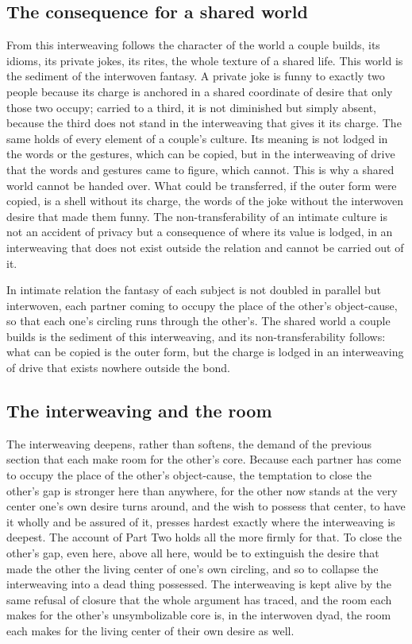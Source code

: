 \subsection*{The consequence for a shared world}

From this interweaving follows the character of the world a couple builds, its idioms, its private jokes, its rites, the whole texture of a shared life. This world is the sediment of the interwoven fantasy. A private joke is funny to exactly two people because its charge is anchored in a shared coordinate of desire that only those two occupy; carried to a third, it is not diminished but simply absent, because the third does not stand in the interweaving that gives it its charge. The same holds of every element of a couple's culture. Its meaning is not lodged in the words or the gestures, which can be copied, but in the interweaving of drive that the words and gestures came to figure, which cannot. This is why a shared world cannot be handed over. What could be transferred, if the outer form were copied, is a shell without its charge, the words of the joke without the interwoven desire that made them funny. The non-transferability of an intimate culture is not an accident of privacy but a consequence of where its value is lodged, in an interweaving that does not exist outside the relation and cannot be carried out of it.

\begin{claim}
In intimate relation the fantasy of each subject is not doubled in parallel but interwoven, each partner coming to occupy the place of the other's object-cause, so that each one's circling runs through the other's. The shared world a couple builds is the sediment of this interweaving, and its non-transferability follows: what can be copied is the outer form, but the charge is lodged in an interweaving of drive that exists nowhere outside the bond.
\end{claim}

\subsection*{The interweaving and the room}

The interweaving deepens, rather than softens, the demand of the previous section that each make room for the other's core. Because each partner has come to occupy the place of the other's object-cause, the temptation to close the other's gap is stronger here than anywhere, for the other now stands at the very center one's own desire turns around, and the wish to possess that center, to have it wholly and be assured of it, presses hardest exactly where the interweaving is deepest. The account of Part Two holds all the more firmly for that. To close the other's gap, even here, above all here, would be to extinguish the desire that made the other the living center of one's own circling, and so to collapse the interweaving into a dead thing possessed. The interweaving is kept alive by the same refusal of closure that the whole argument has traced, and the room each makes for the other's unsymbolizable core is, in the interwoven dyad, the room each makes for the living center of their own desire as well.
